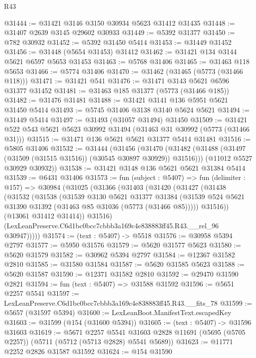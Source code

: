 \begin{lexlean}{R43}
\begin{coremodule}
@31444 := @31421 @3146 @3150 @30934 @5623 @31412 @31435
@31448 := @31407 @2639 @3145 @29602 @30933
@31449 := @5392 @31377
@31450 := @782 @30932
@31452 := @5392 @31450 @5414
@31453 := @31449 @31452
@31456 := @31448 (@5654 @31453) @31412
@31462 := @31421 @134 @3144 @5621 @6597 @5653 @31453
@31463 := @5768 @31406
@31465 := @31463 @118 @5653
@31466 := @5774 @31406
@31470 := @31462 (@31465 (@5773 (@31466 @118)))
@31471 := @31421 @541
@31476 := @31471 @3143 @5621 @6596 @31377 @31452
@31481 := @31463 @185 @31377 (@5773 (@31466 @185))
@31482 := @31476 @31481
@31488 := @31421 @3141 @136 @5951 @5621 @31450 @5414
@31493 := @5745 @31406 @3138 @3140 @5624 @5621
@31494 := @31449 @5414
@31497 := @31493 (@31057 @31494) @31450
@31509 := @31421 @522 @543 @5621 @5623 @30992 @31494 (@31463 @31 @30992 (@5773 (@31466 @31)))
@31515 := @31471 @136 @5621 @5621 @31377 @5414 @31481
@31516 := @5805 @31406
@31532 := @31444
    (@31456
      (@31470 (@31482 (@31488 (@31497 (@31509 (@31515 @31516)) (@30545 @30897 @30929)) @31516)))
      (@11012 @5527 @30929 @30932))
@31538 := @31421 @3148 @136 @5621 @5621 @31384 @5414
@31539 := @6431 @31406
@31573 := fun (subject : @5407) =>
  fun (delimiter : @157) =>
  @30984
    (@31025
      (@31366
        (@31403
          (@31420
            (@31427
              (@31438
                (@31532
                  (@31538
                    (@31539
                      @3130
                      @5621
                      @31377
                      @31384
                      (@31539 @524 @5621 @31390 @31392 (@31463 @85 @31036 (@5773 (@31466 @85)))))
                    @31516))
                (@13061 @31412 @31414))
              @31516)
            (LexLeanPreserve.C6d1bc0bcc7cbbb3a169c4e838883ff45.R43.__rel_96 @30947)))))
@31574 := (text : @5407) -> @5518
@31576 := @30958 @5394 @2797
@31577 := @5950 @31576
@31579 := @5620 @31577 @5623
@31580 := @5620 @31579
@31582 := @30962 @5394 @2797
@31584 := @12367 @31582 @2810
@31585 := @31580 @31584
@31587 := @5620 @31585 @5623
@31588 := @5620 @31587
@31590 := @12371 @31582 @2810
@31592 := @29470 @31590 @2821
@31594 := fun (text : @5407) => @31588 @31592
@31596 := @5651 @2257 @5541
@31597 := LexLeanPreserve.C6d1bc0bcc7cbbb3a169c4e838883ff45.R43.__fits_78
@31599 := @5657 (@31597 @5394)
@31600 := LexLeanBoot.ManifestText.escapedKey
@31603 := @31599 (@154 (@31600 @5394))
@31605 := (text : @5407) -> @31596 @31603
@31619 := @5671
    @2257
    @5541
    @31603
    @2828
    @11691
    (@5695 (@5705 @2257))
    (@5711 (@5712 (@5713 @2828) @5541 @5689))
@31623 := @11771 @2252 @2826 @31587 @31592
@31624 := @154 @31590

\end{coremodule}
\end{lexlean}
